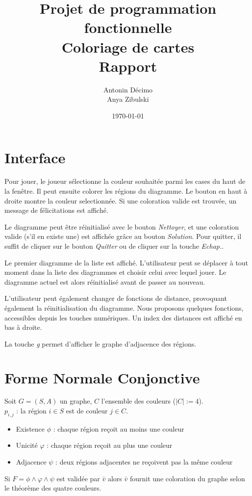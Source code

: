 \documentclass{article}
\begin{document}
\title{Projet de programmation fonctionnelle\\
Coloriage de cartes\\
Rapport}
\author{Antonin Décimo\\ Anya Zibulski}
\date{\today}
\maketitle

\section{Interface}
Pour jouer, le joueur sélectionne la couleur souhaitée parmi les cases du haut
de la fenêtre. Il peut ensuite colorer les régions du diagramme. Le bouton en
haut à droite montre la couleur selectionnée. Si une coloration valide est
trouvée, un message de félicitations est affiché.

Le diagramme peut être réinitialisé avec le bouton \textit{Nettoyer}, et une
coloration valide (s'il en existe une) est affichée grâce au bouton
\textit{Solution}. Pour quitter, il suffit de cliquer sur le bouton
\textit{Quitter} ou de cliquer sur la touche \textit{Echap.}.

Le premier diagramme de la liste est affiché. L'utilisateur peut se déplacer à
tout moment dans la liste des diagrammes et choisir celui avec lequel jouer.
Le diagramme actuel est alors réinitialisé avant de passer au nouveau.

L'utilisateur peut également changer de fonctions de distance, provoquant
également la réinitialisation du diagramme. Nous proposons quelques fonctions,
accessibles depuis les touches numériques. Un index des distances est affiché en
bas à droite.

La touche \textit{g} permet d'afficher le graphe d'adjacence des régions.

\section{Forme Normale Conjonctive}

Soit $G = (S, A)$ un graphe, $C$ l'ensemble des couleurs ($|C| := 4$). \\
$p_{i, j}$ : la région $i \in S$ est de couleur $j \in C$.
\begin{itemize}
    \item Existence $\phi$ : chaque région reçoit au moins une couleur
    \item Unicité $\varphi$ : chaque région reçoit au plus une couleur
    \item Adjacence $\psi$ : deux régions adjacentes ne reçoivent pas la même couleur
\end{itemize}
Si $F = \phi \land \varphi \land \psi$ est validée par $\bar{v}$ alors $\bar{v}$
fournit une coloration du graphe selon le théorème des quatre couleurs.
\end{document}
